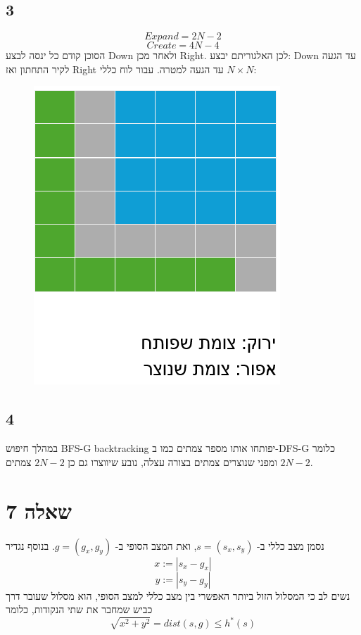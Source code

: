 \documentclass{article}
\begin{document}
\subsection*{3}
$$Expand = 2N - 2$$
$$Create = 4N-4$$
הסוכן קודם כל ינסה לבצע Down ולאחר מכן Right.
לכן האלגוריתם יבצע: Down עד הגעה לקיר התחתון ואז Right עד הגעה למטרה. עבור לוח כללי 
$N\times N$:
\begin{figure}[H]
	\includegraphics[scale=0.5]{3_3}
\end{figure}
\subsection*{4}
במהלך חיפוש 
BFS-G backtracking
יפותחו אותו מספר צמתים כמו ב-DFS-G כלומר
$2N-2$
ומפני שנוצרים צמתים בצורה עצלה, נובע שיווצרו גם כן
$2N-2$
צמתים.
\section{שאלה 7}
נסמן מצב כללי ב-
$s = (s_x, s_y)$,
ואת המצב הסופי ב-
$g = (g_x, g_y)$.
בנוסף נגדיר
$$x := |s_x - g_x|$$
$$y := |s_y - g_y|$$
נשים לב כי המסלול הזול ביותר האפשרי בין מצב כללי למצב הסופי, הוא מסלול שעובר דרך כביש שמחבר את שתי הנקודות, כלומר
$$\sqrt{x^2+y^2} = dist(s,g) \leq h^*(s)$$
\end{document}
